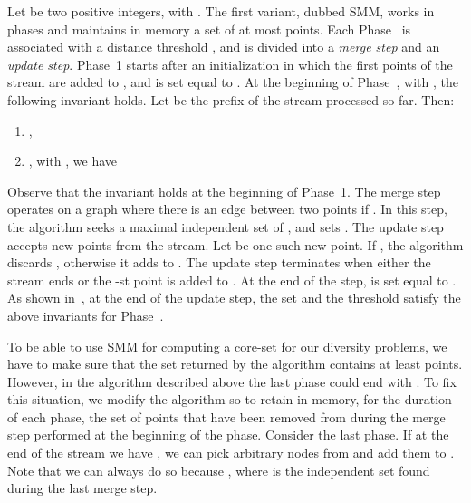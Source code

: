 \documentclass{article}
\begin{document}
Let  be two positive integers, with . The first
variant, dubbed {\sc SMM}, works in phases and maintains in memory
a set  of at most  points. Each Phase~ is associated
with a distance threshold , and is divided into a \emph{merge
  step} and an \emph{update step}. Phase~1 starts after an
initialization in which the first  points of the stream are
added to , and  is set equal to
. At the beginning of Phase~,
with , the following invariant holds. Let  be the
prefix of the stream processed so far. Then:
\begin{enumerate}
\item , 
\item , with , we have 
\end{enumerate}

Observe that the invariant holds at the beginning of Phase~1.  The
merge step operates on a graph  where there is an edge
 between two points  if
. In this step, the algorithm seeks a maximal
independent set  of , and sets . The update
step accepts new points from the stream. Let  be one such new
point. If , the algorithm discards , otherwise it
adds  to . The update step terminates when either the stream
ends or the -st point is added to . At the end of the step,
 is set equal to . As shown in~\cite{CharikarCFM04}, at
the end of the update step, the set  and the threshold 
satisfy the above invariants for Phase~.

To be able to use {\sc SMM} for computing a core-set for our diversity
problems, we have to make sure that the set  returned by the
algorithm contains at least  points. However, in the algorithm
described above the last phase could end with . To fix this
situation, we modify the algorithm so to retain in memory, for the
duration of each phase, the set  of points that have been removed
from  during the merge step performed at the beginning of the
phase. Consider the last phase. If at the end of the stream we have
, we can pick  arbitrary nodes from  and add them
to . Note that we can always do so because
, where  is the independent set found
during the last merge step.
\end{document}
